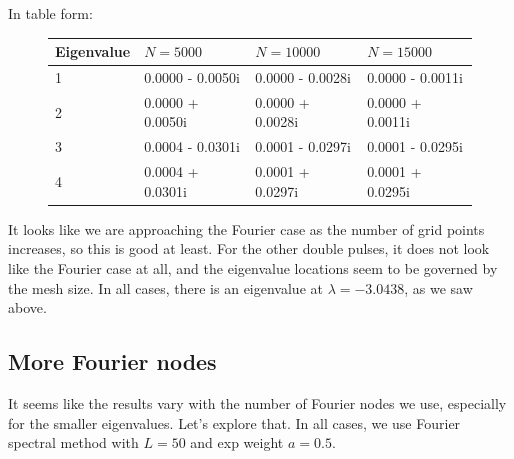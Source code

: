 \documentclass[12pt]{article}
\begin{document}
In table form:
\begin{figure}[H]
\begin{tabular}{l|lll}
Eigenvalue & $N = 5000$ & $N = 10000$  & $N = 15000$\\ \hline
1     &       0.0000 - 0.0050i &     0.0000 - 0.0028i    &  0.0000 - 0.0011i\\
2     &       0.0000 + 0.0050i &     0.0000 + 0.0028i    &  0.0000 + 0.0011i\\
3     &       0.0004 - 0.0301i &     0.0001 - 0.0297i    &  0.0001 - 0.0295i\\
4     &       0.0004 + 0.0301i &     0.0001 + 0.0297i    &  0.0001 + 0.0295i\\       
\end{tabular}
\end{figure}
It looks like we are approaching the Fourier case as the number of grid points increases, so this is good at least. For the other double pulses, it does not look like the Fourier case at all, and the eigenvalue locations seem to be governed by the mesh size. In all cases, there is an eigenvalue at $\lambda = -3.0438$, as we saw above.

\subsection*{More Fourier nodes}
It seems like the results vary with the number of Fourier nodes we use, especially for the smaller eigenvalues. Let's explore that. In all cases, we use Fourier spectral method with $L = 50$ and exp weight $a = 0.5$.
\end{document}
